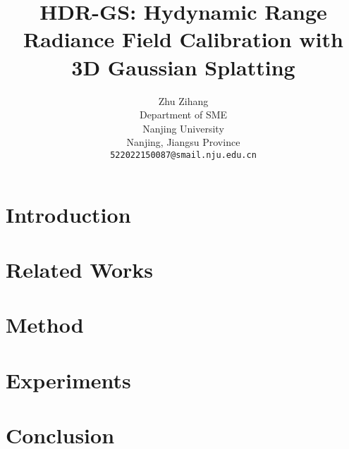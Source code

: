 \documentclass{arxiv_art/arxiv_art}
\title{HDR-GS: Hydynamic Range Radiance Field Calibration with 3D Gaussian Splatting}
\author{
    \hspace{1mm}Zhu Zihang \\
    Department of SME \\
    Nanjing University\\
    Nanjing, Jiangsu Province \\
    \texttt{522022150087@smail.nju.edu.cn}
}
\begin{document}
\maketitle 

\begin{abstract}
    
\end{abstract}

\section{Introduction}
\label{sec:intro}


\section{Related Works}
\label{sec:related}


\section{Method}
\label{sec:method}


\section{Experiments}
\label{sec:experiments}


\section{Conclusion}
\label{sec:conclusion}



%
%


\end{document}
